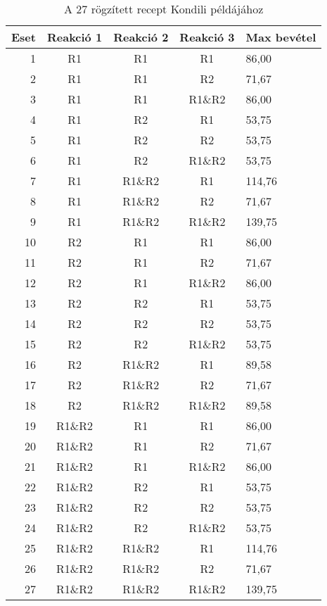 \begin{table}[H]
	\begin{center}
		\caption{A 27 rögzített recept Kondili példájához}
		\captionsetup[table]{skip=10pt}
		\begin{tabular}{r|ccc|l}
		Eset & Reakció 1 & Reakció 2 & Reakció 3 & Max bevétel  \\ 
		\hline
		1    & R1        & R1        & R1        & 86,00        \\
		2    & R1        & R1        & R2        & 71,67        \\
		3    & R1        & R1        & R1\&R2    & 86,00        \\
		4    & R1        & R2        & R1        & 53,75        \\
		5    & R1        & R2        & R2        & 53,75        \\
		6    & R1        & R2        & R1\&R2    & 53,75        \\
		7    & R1        & R1\&R2    & R1        & 114,76       \\
		8    & R1        & R1\&R2    & R2        & 71,67        \\
		9    & R1        & R1\&R2    & R1\&R2    & 139,75       \\
		10   & R2        & R1        & R1        & 86,00        \\
		11   & R2        & R1        & R2        & 71,67        \\
		12   & R2        & R1        & R1\&R2    & 86,00        \\
		13   & R2        & R2        & R1        & 53,75        \\
		14   & R2        & R2        & R2        & 53,75        \\
		15   & R2        & R2        & R1\&R2    & 53,75        \\
		16   & R2        & R1\&R2    & R1        & 89,58        \\
		17   & R2        & R1\&R2    & R2        & 71,67        \\
		18   & R2        & R1\&R2    & R1\&R2    & 89,58        \\
		19   & R1\&R2    & R1        & R1        & 86,00        \\
		20   & R1\&R2    & R1        & R2        & 71,67        \\
		21   & R1\&R2    & R1        & R1\&R2    & 86,00        \\
		22   & R1\&R2    & R2        & R1        & 53,75        \\
		23   & R1\&R2    & R2        & R2        & 53,75        \\
		24   & R1\&R2    & R2        & R1\&R2    & 53,75        \\
		25   & R1\&R2    & R1\&R2    & R1        & 114,76       \\
		26   & R1\&R2    & R1\&R2    & R2        & 71,67        \\
		27   & R1\&R2    & R1\&R2    & R1\&R2    & 139,75      
		\end{tabular}
	\end{center}
\end{table}

